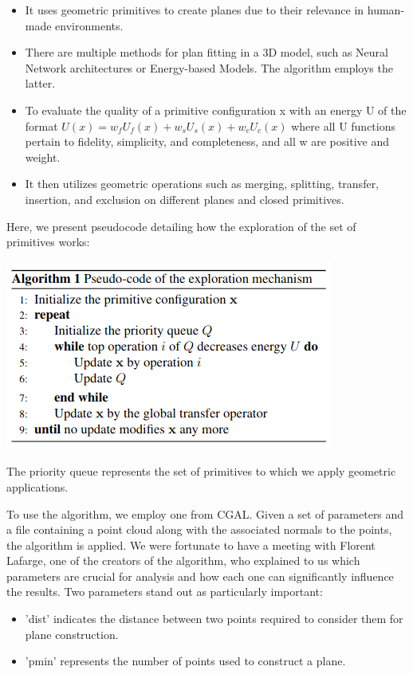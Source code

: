 \documentclass{article}
\begin{document}
\begin{itemize}
\item It uses geometric primitives to create planes due to their relevance in human-made environments.
\item There are multiple methods for plan fitting in a 3D model, such as Neural Network architectures or Energy-based Models. The algorithm employs the latter.
\item To evaluate the quality of a primitive configuration x with an energy U of the format
  \newline 
  $        U(x) = w_f U_f(x) + w_s U_s(x) + w_c U_c(x)       $
  \newline
  where all U functions pertain to fidelity, simplicity, and completeness, and all w are positive and weight.
  \item It then utilizes geometric operations such as merging, splitting, transfer, insertion, and exclusion on different planes and closed primitives.
\end{itemize}
  Here, we present pseudocode detailing how the exploration of the set of primitives works:
\begin{center}
  \includegraphics[scale =  0.5]{../../images/Pseudo_code_exploration.png}
\end{center}
The priority queue represents the set of primitives to which we apply geometric applications.

To use the algorithm, we employ one from CGAL. Given a set of parameters and a file containing a point cloud along with the associated normals to the points,
the algorithm is applied. We were fortunate to have a meeting with Florent Lafarge, one of the creators of the algorithm,
who explained to us which parameters are crucial for analysis and how each one can significantly influence the results.
Two parameters stand out as particularly important: 
\begin{itemize}
  \item 'dist' indicates the distance between two points required to consider them for plane construction.
  \item 'pmin' represents the number of points used to construct a plane.
\end{itemize}
\end{document}
